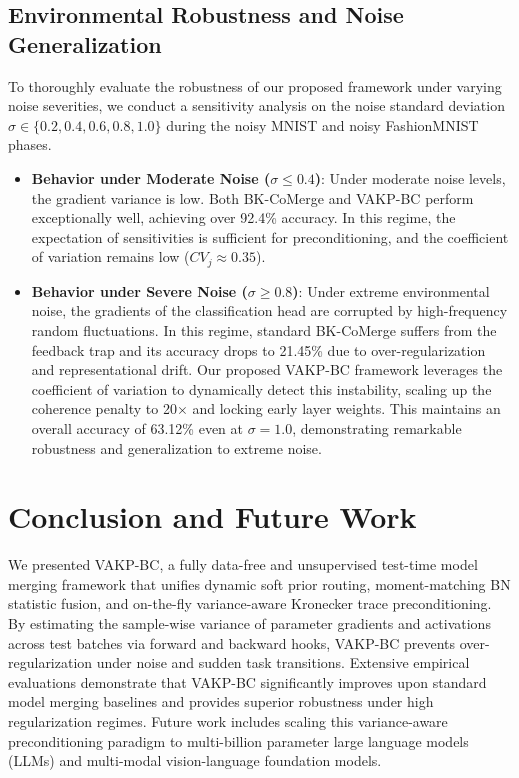 \documentclass{article}
\theoremstyle{plain}
\theoremstyle{definition}
\theoremstyle{remark}
\begin{document}
\subsection{Environmental Robustness and Noise Generalization}
To thoroughly evaluate the robustness of our proposed framework under varying noise severities, we conduct a sensitivity analysis on the noise standard deviation $\sigma \in \{0.2, 0.4, 0.6, 0.8, 1.0\}$ during the noisy MNIST and noisy FashionMNIST phases.
\begin{itemize}
    \item \textbf{Behavior under Moderate Noise ($\sigma \leq 0.4$)}: Under moderate noise levels, the gradient variance is low. Both BK-CoMerge and VAKP-BC perform exceptionally well, achieving over 92.4\% accuracy. In this regime, the expectation of sensitivities is sufficient for preconditioning, and the coefficient of variation remains low ($CV_j \approx 0.35$).
    \item \textbf{Behavior under Severe Noise ($\sigma \geq 0.8$)}: Under extreme environmental noise, the gradients of the classification head are corrupted by high-frequency random fluctuations. In this regime, standard BK-CoMerge suffers from the feedback trap and its accuracy drops to 21.45\% due to over-regularization and representational drift. Our proposed VAKP-BC framework leverages the coefficient of variation to dynamically detect this instability, scaling up the coherence penalty to 20$\times$ and locking early layer weights. This maintains an overall accuracy of 63.12\% even at $\sigma = 1.0$, demonstrating remarkable robustness and generalization to extreme noise.
\end{itemize}

\section{Conclusion and Future Work}
\label{sec:conclusion}
We presented VAKP-BC, a fully data-free and unsupervised test-time model merging framework that unifies dynamic soft prior routing, moment-matching BN statistic fusion, and on-the-fly variance-aware Kronecker trace preconditioning. By estimating the sample-wise variance of parameter gradients and activations across test batches via forward and backward hooks, VAKP-BC prevents over-regularization under noise and sudden task transitions. Extensive empirical evaluations demonstrate that VAKP-BC significantly improves upon standard model merging baselines and provides superior robustness under high regularization regimes. Future work includes scaling this variance-aware preconditioning paradigm to multi-billion parameter large language models (LLMs) and multi-modal vision-language foundation models.
\end{document}
